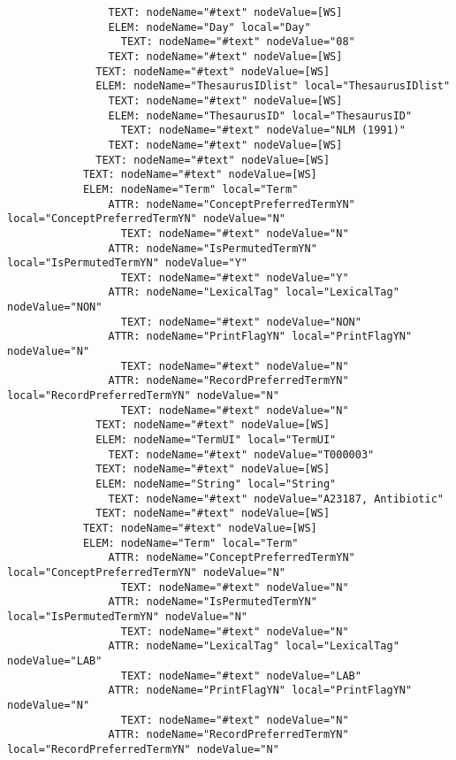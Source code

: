 \documentclass[11pt,english]{article}
\begin{document}
\begin{enumerate}
\begin{lstlisting}
                TEXT: nodeName="#text" nodeValue=[WS]
                ELEM: nodeName="Day" local="Day"
                  TEXT: nodeName="#text" nodeValue="08"
                TEXT: nodeName="#text" nodeValue=[WS]
              TEXT: nodeName="#text" nodeValue=[WS]
              ELEM: nodeName="ThesaurusIDlist" local="ThesaurusIDlist"
                TEXT: nodeName="#text" nodeValue=[WS]
                ELEM: nodeName="ThesaurusID" local="ThesaurusID"
                  TEXT: nodeName="#text" nodeValue="NLM (1991)"
                TEXT: nodeName="#text" nodeValue=[WS]
              TEXT: nodeName="#text" nodeValue=[WS]
            TEXT: nodeName="#text" nodeValue=[WS]
            ELEM: nodeName="Term" local="Term"
                ATTR: nodeName="ConceptPreferredTermYN" local="ConceptPreferredTermYN" nodeValue="N"
                  TEXT: nodeName="#text" nodeValue="N"
                ATTR: nodeName="IsPermutedTermYN" local="IsPermutedTermYN" nodeValue="Y"
                  TEXT: nodeName="#text" nodeValue="Y"
                ATTR: nodeName="LexicalTag" local="LexicalTag" nodeValue="NON"
                  TEXT: nodeName="#text" nodeValue="NON"
                ATTR: nodeName="PrintFlagYN" local="PrintFlagYN" nodeValue="N"
                  TEXT: nodeName="#text" nodeValue="N"
                ATTR: nodeName="RecordPreferredTermYN" local="RecordPreferredTermYN" nodeValue="N"
                  TEXT: nodeName="#text" nodeValue="N"
              TEXT: nodeName="#text" nodeValue=[WS]
              ELEM: nodeName="TermUI" local="TermUI"
                TEXT: nodeName="#text" nodeValue="T000003"
              TEXT: nodeName="#text" nodeValue=[WS]
              ELEM: nodeName="String" local="String"
                TEXT: nodeName="#text" nodeValue="A23187, Antibiotic"
              TEXT: nodeName="#text" nodeValue=[WS]
            TEXT: nodeName="#text" nodeValue=[WS]
            ELEM: nodeName="Term" local="Term"
                ATTR: nodeName="ConceptPreferredTermYN" local="ConceptPreferredTermYN" nodeValue="N"
                  TEXT: nodeName="#text" nodeValue="N"
                ATTR: nodeName="IsPermutedTermYN" local="IsPermutedTermYN" nodeValue="N"
                  TEXT: nodeName="#text" nodeValue="N"
                ATTR: nodeName="LexicalTag" local="LexicalTag" nodeValue="LAB"
                  TEXT: nodeName="#text" nodeValue="LAB"
                ATTR: nodeName="PrintFlagYN" local="PrintFlagYN" nodeValue="N"
                  TEXT: nodeName="#text" nodeValue="N"
                ATTR: nodeName="RecordPreferredTermYN" local="RecordPreferredTermYN" nodeValue="N"

\end{lstlisting}
\end{enumerate}
\end{document}
